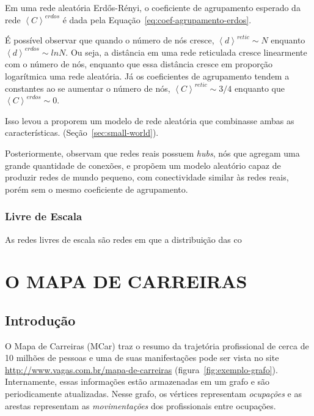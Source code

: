 \documentclass[12pt,a4paper]{article}
\theoremstyle{hypo}
\newcommand{\avg}[1]{\left\langle #1 \right\rangle} %
\begin{document}
Em uma rede aleatória Erdős-Rényi, o coeficiente de agrupamento esperado da rede $\avg{C}^\textit{erdos}$ é dada pela Equação~\ref{eq:coef-agrupamento-erdos}.

É possível observar que quando o número de nós cresce, $\avg{d}^\textit{retic} \sim N$ enquanto $\avg{d}^\textit{erdos} \sim ln N$. Ou seja, a distância em uma rede reticulada cresce linearmente com o número de nós, enquanto que essa distância cresce em proporção logarítmica uma rede aleatória. Já os coeficientes de agrupamento tendem a constantes ao se aumentar o número de nós, $\avg{C}^\textit{retic} \sim 3 / 4$ enquanto que $\avg{C}^\textit{erdos} \sim 0$.

Isso levou  a proporem um modelo de rede aleatória que combinasse ambas as características. (Seção~\ref{sec:small-world}).

Posteriormente,  observam que redes reais possuem \textit{hubs}, nós que agregam uma grande quantidade de conexões, e propõem um modelo aleatório capaz de produzir redes de mundo pequeno, com conectividade similar às redes reais, porém sem o mesmo coeficiente de agrupamento.

\subsubsection{Livre de Escala} \label{sec:scale-free}

As redes livres de escala são redes em que a distribuição das co


\section{O MAPA DE CARREIRAS}

\subsection{Introdução}

O Mapa de Carreiras (MCar) traz o resumo da trajetória profissional de cerca de 10 milhões de pessoas e uma de suas manifestações pode ser vista no site \url{http://www.vagas.com.br/mapa-de-carreiras} (figura~\ref{fig:exemplo-grafo}). Internamente, essas informações estão armazenadas em um grafo e são periodicamente atualizadas. Nesse grafo, os vértices representam \textit{ocupações} e as arestas representam as \textit{movimentações} dos profissionais entre ocupações.
\end{document}
